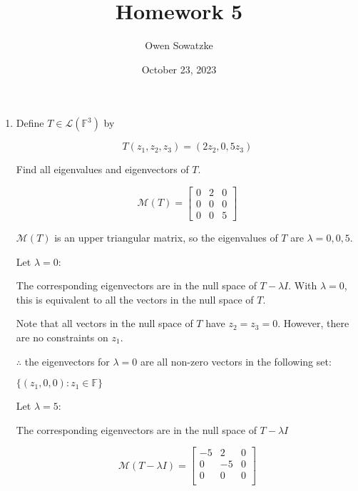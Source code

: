 \documentclass[fleqn]{article}
\title{Homework 5}
\author{Owen Sowatzke}
\date{October 23, 2023}
\makeatletter
\newcommand{\zerodisplayskip}{
	\setlength{\abovedisplayskip}{0pt}%
	\setlength{\belowdisplayskip}{0pt}%
	\setlength{\abovedisplayshortskip}{0pt}%
	\setlength{\belowdisplayshortskip}{0pt}%
	\setlength{\mathindent}{0pt}}
\newenvironment{equationCenter}{\@fleqnfalse\begin{equation*}}{\end{equation*}}
\makeatother
\begin{document}
	\offinterlineskip
	\setlength{\lineskip}{12pt}
	\zerodisplayskip
	\maketitle
	
	\begin{enumerate}[nolistsep]
		\item Define $T \in \mathcal{L}(\mathbb{F}^3)$ by
		
		\begin{equationCenter}
			T(z_1, z_2, z_3) = (2z_2, 0, 5z_3)
		\end{equationCenter}
		
		Find all eigenvalues and eigenvectors of $T$.
		
		\begin{equation*}
			\mathcal{M}(T) = \begin{bmatrix}
				0 & 2 & 0 \\
				0 & 0 & 0 \\
				0 & 0 & 5
			\end{bmatrix}
		\end{equation*}
		
		$\mathcal{M}(T)$ is an upper triangular matrix, so the eigenvalues of $T$ are $\lambda = 0, 0, 5$.
		
		Let $\lambda = 0$:
		
		The corresponding eigenvectors are in the null space of $T - {\lambda}I$. With $\lambda = 0$, this is equivalent to all the vectors in the null space of $T$.
		
		Note that all vectors in the null space of $T$ have $z_2 = z_3 = 0$. However, there are no constraints on $z_1$.
		
		$\therefore$ the eigenvectors for $\lambda = 0$ are all non-zero vectors in the following set:
		
		$\{(z_1, 0, 0) : z_1 \in \mathbb{F}\}$
		
		Let $\lambda = 5$:
		
		The corresponding eigenvectors are in the null space of $T - {\lambda}I$
		
		\begin{equation*}
			\mathcal{M}(T - {\lambda}I) = \begin{bmatrix}
				-5 &  2 & 0 \\
				 0 & -5 & 0 \\
				 0 &  0 & 0 \\
			\end{bmatrix}
		\end{equation*}
		

\end{enumerate}
\end{document}
